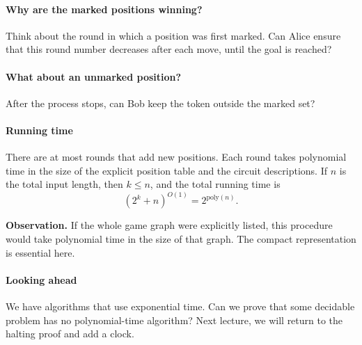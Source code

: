\documentclass[11  pt]{article}
\begin{document}
\paragraph{Why are the marked positions winning?}
Think about the round in which a position was first marked. Can Alice ensure that this round number decreases after each move, until the goal is reached?
\vs{1cm}

\paragraph{What about an unmarked position?}
After the process stops, can Bob keep the token outside the marked set?
\vs{1cm}

\paragraph{Running time}
There are at most  rounds that add new positions. Each round takes polynomial time in the size of the explicit position table and the circuit descriptions. If $n$ is the total input length, then $k\leq n$, and the total running time is
\begin{equation*}
    (2^k+n)^{O(1)}=2^{\mathrm{poly}(n)}.
\end{equation*}

\vfill
\textbf{Observation.} If the whole game graph were explicitly listed, this procedure would take polynomial time in the size of that graph. The compact representation is essential here.



\paragraph{Looking ahead}
We have algorithms that use exponential time. Can we prove that some decidable problem has no polynomial-time algorithm? Next lecture, we will return to the halting proof and add a clock.
\end{document}
